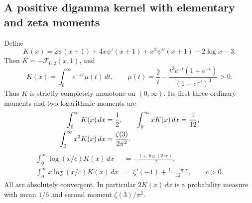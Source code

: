 \subsection{A positive digamma kernel with elementary and zeta moments}

Define
\begin{equation}\label{stce:positive-K}
 K(x)=2\psi(x+1)+4x\psi'(x+1)+x^2\psi''(x+1)-2\log x-3.
\end{equation}
Then $K=-\mathcal F_{0,2}(x,1)$, and
\begin{equation}\label{stce:K-Laplace}
 K(x)=\int_0^\infty e^{-xt}\mu(t)\,dt,\qquad
 \mu(t)=\frac2t-\frac{t^2e^{-t}(1+e^{-t})}{(1-e^{-t})^3}>0.
\end{equation}
Thus $K$ is strictly completely monotone on $(0,\infty)$.
Its first three ordinary moments and two logarithmic moments are
\begin{align}
 \int_0^\infty K(x)\,dx&=\frac12,\qquad
 \int_0^\infty xK(x)\,dx=\frac1{12},\notag\\
 \int_0^\infty x^2K(x)\,dx&=\frac{\zeta(3)}{2\pi^2}.
       \label{stce:K-moments}
\end{align}
\begin{align}
 \int_0^\infty\log(x/c)K(x)\,dx
     &=-\frac{1+\log(2\pi c)}2,\label{stce:K-log0}\\
 \int_0^\infty x\log(x/c)K(x)\,dx
     &=\zeta'(-1)+\frac{1-\log c}{12},\qquad c>0.
       \label{stce:K-log1}
\end{align}
All are absolutely convergent.  In particular $2K(x)\,dx$ is a
probability measure with mean $1/6$ and second moment $\zeta(3)/\pi^2$.

